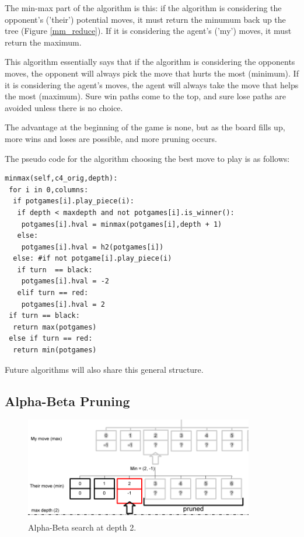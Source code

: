 \documentclass[12pt]{article}
\begin{document}
The min-max part of the algorithm is this: if the algorithm is considering the opponent's ('their') potential
moves, it must return the minumum back up the tree (Figure \ref{mm_reduce}). If it is considering the agent's ('my') moves, it must return the maximum. 

This algorithm essentially says that if the algorithm is considering the opponents moves, the
opponent will always pick the move that hurts the most (minimum). If it is considering the agent's moves,
the agent will always take the move that helps the most (maximum). Sure win paths come to the top, and sure lose paths are avoided unless there is no choice.

The advantage at the beginning of the game is none, but as the board fills up, more wins and loses are possible, and more pruning occurs.

\pagebreak

The pseudo code for the algorithm choosing the best move to play is as follows:

\scriptsize
\begin{lstlisting}
minmax(self,c4_orig,depth):
 for i in 0,columns:
  if potgames[i].play_piece(i):
   if depth < maxdepth and not potgames[i].is_winner():
    potgames[i].hval = minmax(potgames[i],depth + 1)
   else:
    potgames[i].hval = h2(potgames[i])
  else: #if not potgame[i].play_piece(i)
   if turn  == black:
    potgames[i].hval = -2
   elif turn == red:
    potgames[i].hval = 2
 if turn == black:
  return max(potgames)
 else if turn == red:
  return min(potgames)
\end{lstlisting}
\normalsize

Future algorithms will also share this general structure.


\subsection{Alpha-Beta Pruning}

\begin{figure}[h]
        \begin{center}
		\includegraphics[width=100mm]{report_images/ab_d2.png}
                	\caption{Alpha-Beta search at depth 2.}
                	\label{ab_d2}
        \end{center}
\end{figure}
\end{document}
